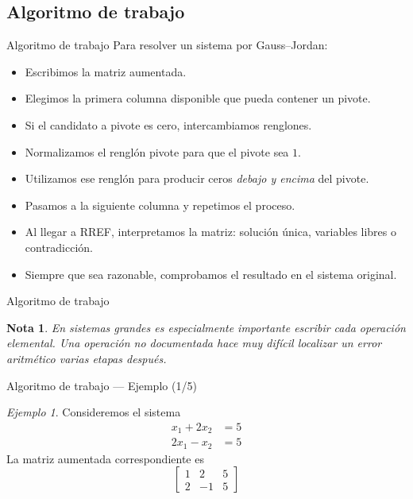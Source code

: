 \documentclass[aspectratio=169,11pt]{beamer}
\newtheorem{Nota}[definicion]{Nota}
\theoremstyle{remark}
\newtheorem{Ejem}[definicion]{Ejemplo}
\begin{document}
\subsection*{Algoritmo de trabajo}
\begin{frame}[allowframebreaks]{Algoritmo de trabajo}
\footnotesize
Para resolver un sistema por Gauss--Jordan:

\begin{itemize}
\item Escribimos la matriz aumentada.
\item Elegimos la primera columna disponible que pueda contener un pivote.
\item Si el candidato a pivote es cero, intercambiamos renglones.
\item Normalizamos el renglón pivote para que el pivote sea \(1\).
\item Utilizamos ese renglón para producir ceros \emph{debajo y encima} del pivote.
\item Pasamos a la siguiente columna y repetimos el proceso.
\item Al llegar a RREF, interpretamos la matriz: solución única, variables libres o contradicción.
\item Siempre que sea razonable, comprobamos el resultado en el sistema original.
\end{itemize}
\end{frame}

\begin{frame}{Algoritmo de trabajo}
\begin{Nota}
En sistemas grandes es especialmente importante escribir cada operación elemental. Una operación no documentada hace muy difícil localizar un error aritmético varias etapas después.
\end{Nota}
\end{frame}

\begin{frame}{Algoritmo de trabajo — Ejemplo (1/5)}
\begin{Ejem}
Consideremos el sistema
\[
\begin{aligned}
x_{1} + 2 x_{2} &= 5\\
2 x_{1} - x_{2} &= 5
\end{aligned}
\]
La matriz aumentada correspondiente es
\[
\left[\begin{array}{cc|c}
1 & 2 & 5\\
2 & -1 & 5
\end{array}\right]
\]
\end{Ejem}
\end{frame}
\end{document}
